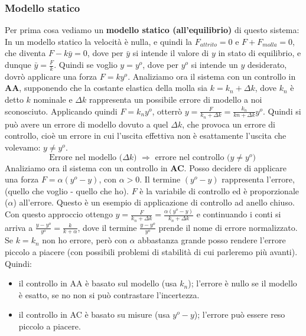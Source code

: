 \subsubsection*{Modello statico}
Per prima cosa vediamo un \textbf{modello statico (all'equilibrio)} di questo sistema:\newline
In un modello statico la velocità è nulla, e quindi la $F_{attrito} = 0$ e $F + F_{molla} = 0$, che diventa $F-k \bar{y} = 0$, dove per $\bar{y}$ si intende il valore di $y$ in stato di equilibrio, e dunque $\bar{y} = \frac{F}{k}$.\newline
Quindi se voglio $y = y^o$, dove per $y^o$ si intende un $y$ desiderato, dovrò applicare una forza $F = k y^o$.\newline
\newline
Analiziamo ora il sistema con un controllo in \textbf{AA}, supponendo che la costante elastica della molla sia $k = k_n + \Delta k$, dove $k_n$ è detto $k$ nominale e $\Delta k$ rappresenta un possibile errore di modello a noi sconosciuto.\newline
Applicando quindi $F = k_n y^o$, otterrò $y = \frac{F}{k_n + \Delta k} = \frac{k_n}{kn + \Delta k} y^o$. Quindi si può avere un errore di modello dovuto a quel $\Delta k$, che provoca un errore di controllo, cioè un errore in cui l'uscita effettiva non è esattamente l'uscita che volevamo: $y \neq y^o$.\newline
\[
    \text{Errore nel modello ($\Delta k$) $\Longrightarrow$ errore nel controllo ($y \neq y^o$)}\;
\]
\newline
Analiziamo ora il sistema con un controllo in \textbf{AC}.\newline
Posso decidere di applicare una forza $F = \alpha (y^o -y)$, con $\alpha>0$. Il termine $(y^o - y)$ rappresenta l'errore, (quello che voglio - quello che ho). $F$ è la variabile di controllo ed è proporzionale ($\alpha$) all'errore.\newline
Questo è un esempio di applicazione di controllo ad anello chiuso.\newline
Con questo approccio ottengo $y = \frac{F}{k_n + \Delta k} = \frac{\alpha (y^o - y)}{k_n + \Delta k}$ e continuando i conti si arriva a $\frac{y - y^o}{y^o} = \frac{k}{k+\alpha}$, dove il termine $\frac{y-y^o}{y^o}$ prende il nome di errore normalizzato. Se $k = k_n$ non ho errore, però con $\alpha$ abbastanza grande posso rendere l'errore piccolo a piacere (con possibili problemi di stabilità di cui parleremo più avanti).\newline
\newline
Quindi:
\begin{itemize}
    \item  il controllo in AA è basato sul modello (usa $k_n$); l'errore è nullo se il modello è esatto, se no non si può contrastare l'incertezza.
    \item il controllo in AC è basato su misure (usa $y^o-y$); l'errore può essere reso piccolo a piacere.
\end{itemize}
